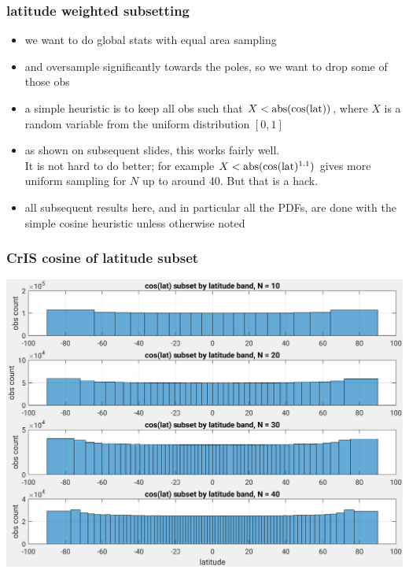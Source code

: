 \documentclass[11pt]{beamer}
\begin{document}
\begin{frame}
\frametitle{latitude weighted subsetting}

\begin{itemize}

  \item we want to do global stats with equal area sampling

  \item {\airs} and {\cris} oversample significantly towards the
    poles, so we want to drop some of those obs

  \item a simple heuristic is to keep all obs such that $X <
    \mbox{abs}(\cos(\mbox{lat}))$, where $X$ is a random variable from the
    uniform distribution $[0, 1]$

  \item as shown on subsequent slides, this works fairly well. \\ It
    is not hard to do better; for example $X <
    \mbox{abs}(\cos(\mbox{lat})^{1.1})$ gives more uniform sampling for $N$ up
    to around 40.  But that is a hack.

  \item all subsequent results here, and in particular all the PDFs,
    are done with the simple cosine heuristic unless otherwise noted

\end{itemize}
\end{frame}
\begin{frame}
\frametitle{CrIS cosine of latitude subset}
\begin{center}
  \includegraphics[scale=0.5]{figures/cris_cos_lat_subset.pdf}
\end{center}
\end{frame} %
\end{document}
